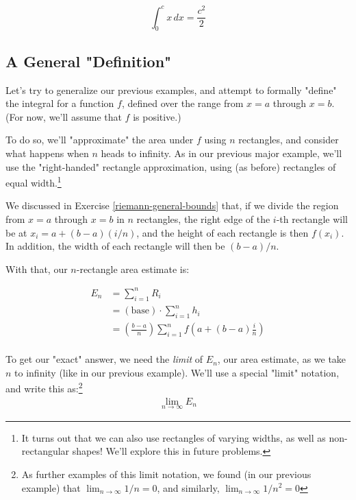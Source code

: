 \documentclass{book}
\begin{document}
\begin{equation}
\int_{0}^{c} x\, dx = \frac{c^2}{2}
\end{equation}



\subsection{A General "Definition"}


Let's try to generalize our previous examples, and attempt to formally "define" the integral for a function $f$, defined over the range from $x = a$ through $x = b$. (For now, we'll assume that $f$ is positive.) 

To do so, we'll "approximate" the area under $f$ using $n$ rectangles, and consider what happens when $n$ heads to infinity. As in our previous major example, we'll use the "right-handed" rectangle approximation, using (as before) rectangles of equal width.\footnote{It turns out that we can also use rectangles of varying widths, as well as non-rectangular shapes! We'll explore this in future problems.}


We discussed in Exercise \ref{riemann-general-bounds} that, if we divide the region from $x = a$ through $x = b$ in $n$ rectangles, the right edge of the $i$-th rectangle will be at $x_i = a + (b-a)(i/n)$, and the height of each rectangle is then $f(x_i)$. In addition, the width of each rectangle will then be $(b - a)/n$. 

With that, our $n$-rectangle area estimate is:

\begin{align*}
E_n &= \sum_{i=1}^n R_i \\
&= (\text{base}) \cdot \sum_{i=1}^n h_i \\
&= \left(\frac{b-a}{n}\right) \sum_{i=1}^n f\left(a + (b-a)\frac{i}{n}\right) \\
\end{align*}

To get our "exact" answer, we need the \emph{limit} of $E_n$, our area estimate, as we take $n$ to infinity (like in our previous example). We'll use a special "limit" notation, and write this as:\footnote{As further examples of this limit notation, we found (in our previous example) that $\lim_{n \rightarrow \infty} 1/n = 0$, and similarly, $\lim_{n \rightarrow \infty} 1/n^2 = 0$}
\begin{align*}
\lim_{n \rightarrow \infty} E_n
\end{align*}
\end{document}
